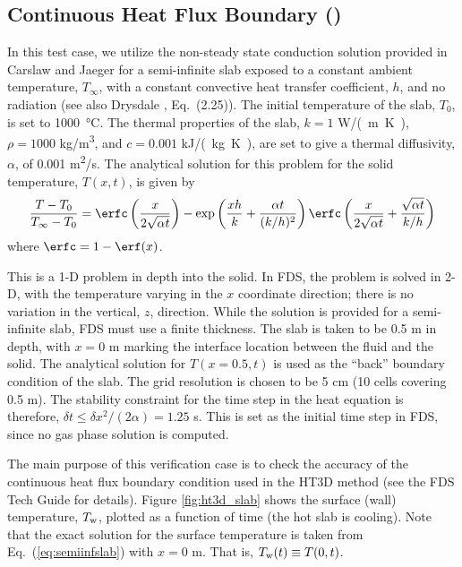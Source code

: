 \documentclass[11pt]{book}
\begin{document}
\FloatBarrier


\subsection{Continuous Heat Flux Boundary (\texorpdfstring{}{ht3d\_slab})}
\label{ht3d_slab}

In this test case, we utilize the non-steady state conduction solution provided in Carslaw and Jaeger \cite{Carslaw:1} for a semi-infinite slab exposed to a constant ambient temperature, $T_\infty$, with a constant convective heat transfer coefficient, $h$, and no radiation (see also Drysdale \cite{Drysdale:1}, Eq.~(2.25)).  The initial temperature of the slab, $T_0$, is set to \SI{1000}{\degreeCelsius}. The thermal properties of the slab, $k=1$ \si{W/(m.K)}, $\rho=1000$ \si{kg/m^3}, and $c=0.001$ \si{kJ/(kg.K)}, are set to give a thermal diffusivity, $\alpha$, of 0.001 \si{m^2/s}. The analytical solution for this problem for the solid temperature, $T(x,t)$, is given by
\begin{equation}
\label{eq:semiinfslab}
\frac{T - T_0}{T_\infty - T_0} = \erfc\left(\frac{x}{2\sqrt{\alpha t}}\right) - \exp\left( \frac{xh}{k} + \frac{\alpha t}{(k/h)^2} \right) \erfc\left( \frac{x}{2\sqrt{\alpha t}} + \frac{\sqrt{\alpha t}}{k/h} \right)
\end{equation}
where $\erfc = 1 - \erf(x)$.

This is a 1-D problem in depth into the solid.  In FDS, the problem is solved in 2-D, with the temperature varying in the $x$ coordinate direction; there is no variation in the vertical, $z$, direction.  While the solution is provided for a semi-infinite slab, FDS must use a finite thickness.  The slab is taken to be 0.5 m in depth, with $x=0$ m marking the interface location between the fluid and the solid.  The analytical solution for $T(x=0.5,t)$ is used as the ``back'' boundary condition of the slab.  The grid resolution is chosen to be 5 cm (10 cells covering 0.5 m).  The stability constraint for the time step in the heat equation is therefore, $\delta t \le \delta x^2/(2\alpha) = 1.25$ s.  This is set as the initial time step in FDS, since no gas phase solution is computed.

The main purpose of this verification case is to check the accuracy of the continuous heat flux boundary condition used in the HT3D method (see the FDS Tech Guide \cite{FDS_Math_Guide} for details).  Figure \ref{fig:ht3d_slab} shows the surface (wall) temperature, $T_{\rm w}$, plotted as a function of time (the hot slab is cooling).  Note that the exact solution for the surface temperature is taken from Eq.~(\ref{eq:semiinfslab}) with $x=0$ m.  That is, $T_{\rm w}(t) \equiv T(0,t)$.
\end{document}
